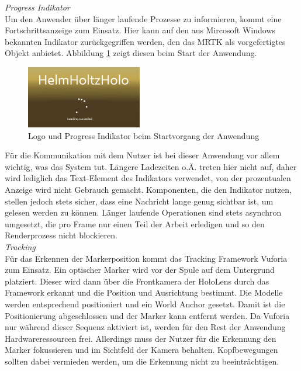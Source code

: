 \textit{Progress Indikator}\\
Um den Anwender über länger laufende Prozesse zu informieren, kommt eine Fortschrittsanzeige zum Einsatz. Hier kann auf den aus Mircosoft Windows bekannten Indikator zurückgegriffen werden, den das MRTK als vorgefertigtes Objekt anbietet. Abbildung \ref{img:pi-load} zeigt diesen beim Start der Anwendung.\\

\begin{figure}
	\centering
	\includegraphics[width=0.45\textwidth]{images/unity/loading.jpg}
	\caption{Logo und Progress Indikator beim Startvorgang der Anwendung}
	\label{img:pi-load}
\end{figure}

Für die Kommunikation mit dem Nutzer ist bei dieser Anwendung vor allem wichtig, was das System tut. Längere Ladezeiten o.Ä. treten hier nicht auf, daher wird lediglich das Text-Element des Indikators verwendet, von der prozentualen Anzeige wird nicht Gebrauch gemacht. Komponenten, die den Indikator nutzen, stellen jedoch stets sicher, dass eine Nachricht lange genug sichtbar ist, um gelesen werden zu können. Länger laufende Operationen sind stets asynchron umgesetzt, die pro Frame nur einen Teil der Arbeit erledigen und so den Renderprozess nicht blockieren.\\

\textit{Tracking}\\
Für das Erkennen der Markerposition kommt das Tracking Framework Vuforia zum Einsatz. Ein optischer Marker wird vor der Spule auf dem Untergrund platziert. Dieser wird dann über die Frontkamera der HoloLens durch das Framework erkannt und die Position und Ausrichtung bestimmt. Die Modelle werden entsprechend positioniert und ein World Anchor gesetzt. Damit ist die Positionierung abgeschlossen und der Marker kann entfernt werden. Da Vuforia nur während dieser Sequenz aktiviert ist, werden für den Rest der Anwendung Hardwareressourcen frei. Allerdings muss der Nutzer für die Erkennung den Marker fokussieren und im Sichtfeld der Kamera behalten. Kopfbewegungen sollten dabei vermieden werden, um die Erkennung nicht zu beeinträchtigen.\\

